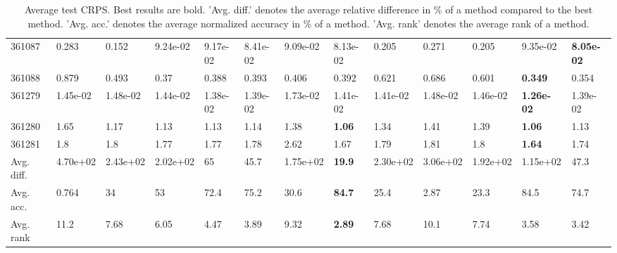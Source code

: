 \begin{table}[ht!]
\begin{tabular}{lllllllllllll}
  361087 & 0.283 & 0.152 & 9.24e-02 & 9.17e-02 & 8.41e-02 & 9.09e-02 & 8.13e-02 & 0.205 & 0.271 & 0.205 & 9.35e-02 & \textbf{8.05e-02} \\ 
  361088 & 0.879 & 0.493 & 0.37 & 0.388 & 0.393 & 0.406 & 0.392 & 0.621 & 0.686 & 0.601 & \textbf{0.349} & 0.354 \\ 
  361279 & 1.45e-02 & 1.48e-02 & 1.44e-02 & 1.38e-02 & 1.39e-02 & 1.73e-02 & 1.41e-02 & 1.41e-02 & 1.48e-02 & 1.46e-02 & \textbf{1.26e-02} & 1.39e-02 \\ 
  361280 & 1.65 & 1.17 & 1.13 & 1.13 & 1.14 & 1.38 & \textbf{1.06} & 1.34 & 1.41 & 1.39 & \textbf{1.06} & 1.13 \\ 
  361281 & 1.8 & 1.8 & 1.77 & 1.77 & 1.78 & 2.62 & 1.67 & 1.79 & 1.81 & 1.8 & \textbf{1.64} & 1.74 \\ 
   \hline
Avg. diff. & 4.70e+02 & 2.43e+02 & 2.02e+02 & 65 & 45.7 & 1.75e+02 & \textbf{19.9} & 2.30e+02 & 3.06e+02 & 1.92e+02 & 1.15e+02 & 47.3 \\ 
  Avg. acc. & 0.764 & 34 & 53 & 72.4 & 75.2 & 30.6 & \textbf{84.7} & 25.4 & 2.87 & 23.3 & 84.5 & 74.7 \\ 
  Avg. rank & 11.2 & 7.68 & 6.05 & 4.47 & 3.89 & 9.32 & \textbf{2.89} & 7.68 & 10.1 & 7.74 & 3.58 & 3.42 \\ 
   \hline
\hline
\end{tabular}
\endgroup
\caption{Average test CRPS. 
                  Best results are bold. 
                  'Avg. diff.' denotes the average relative difference in \% of a method compared to the best method.
                  'Avg. acc.' denotes the average normalized accuracy in \% of a method.
                  'Avg. rank' denotes the average rank of a method.} 
\label{TABLES/table_results_CRPS_umap}
\end{table}
